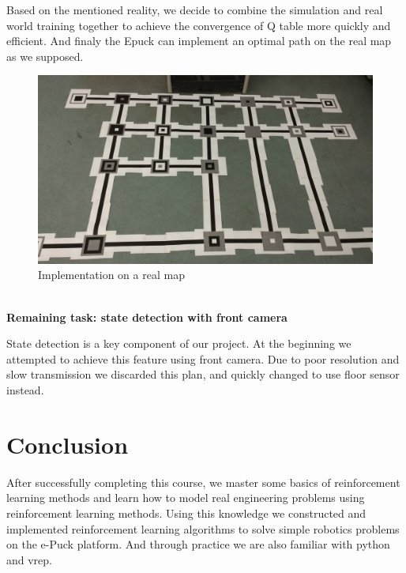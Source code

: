 \documentclass[a4paper, 11pt]{article} %
\begin{document}
Based on the mentioned reality, we decide to combine the simulation and real world training together to achieve the convergence of Q table more quickly and efficient. And finaly the Epuck can implement an optimal path on the real map as we supposed.
\begin{figure}[tb]
\centering 
\includegraphics[width=0.95\columnwidth]{RealMap} 
\caption[An example of a floating figure]{Implementation on a real map} %
\label{fig3} 
\end{figure}
\\[3ex]
\textbf{Remaining task: state detection with front camera}

State
detection is a key component of our project. At the beginning we attempted to
achieve this feature using front camera. Due to poor resolution and slow transmission
we discarded this plan, and quickly changed to use floor sensor instead.

\section{Conclusion}
After successfully completing this course, we master some basics of reinforcement
learning methods and learn how to model real engineering problems using reinforcement
learning methods. Using this knowledge we constructed and implemented reinforcement
learning algorithms to solve simple robotics problems on the e-Puck platform. And
through practice we are also familiar with python and vrep.
\end{document}
